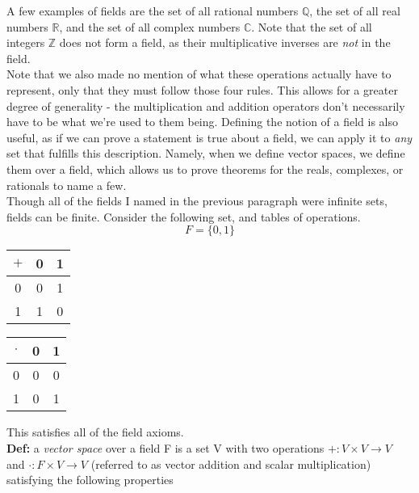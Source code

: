 \documentclass[12pt]{article}
\begin{document}
A few examples of fields are the set of all rational numbers $\mathbb{Q}$, the set of all real numbers $\mathbb{R}$, and the set of all complex numbers $\mathbb{C}$. Note that the set of all integers $\mathbb{Z}$ does not form a field, as their multiplicative inverses are \emph{not} in the field.\\

Note that we also made no mention of what these operations actually have to represent, only that they must follow those four rules. This allows for a greater degree of generality - the multiplication and addition operators don't necessarily have to be what we're used to them being. Defining the notion of a field is also useful, as if we can prove a statement is true about a field, we can apply it to \emph{any} set that fulfills this description. Namely, when we define vector spaces, we define them over a field, which allows us to prove theorems for the reals, complexes, or rationals to name a few. \\

Though all of the fields I named in the previous paragraph were infinite sets, fields can be finite. Consider the following set, and tables of operations.\\

$$F = \{0, 1\}$$

\begin{center}
\begin{tabular}{ c | c c }
$+$ & 0 & 1 \\
\hline
0 & 0 & 1 \\
1 & 1 & 0
\end{tabular}
\qquad \qquad \qquad
\begin{tabular}{ c | c c }
$\cdot$ & 0 & 1 \\
\hline
0 & 0 & 0 \\
1 & 0 & 1
\end{tabular}
\end{center}
This satisfies all of the field axioms.\\

\textbf{Def: }a \emph{vector space} over a field F is a set V with two operations $+:V \times V \rightarrow V$ and $\cdot : F\times V \rightarrow V$ (referred to as vector addition and scalar multiplication) satisfying the following properties
\end{document}
